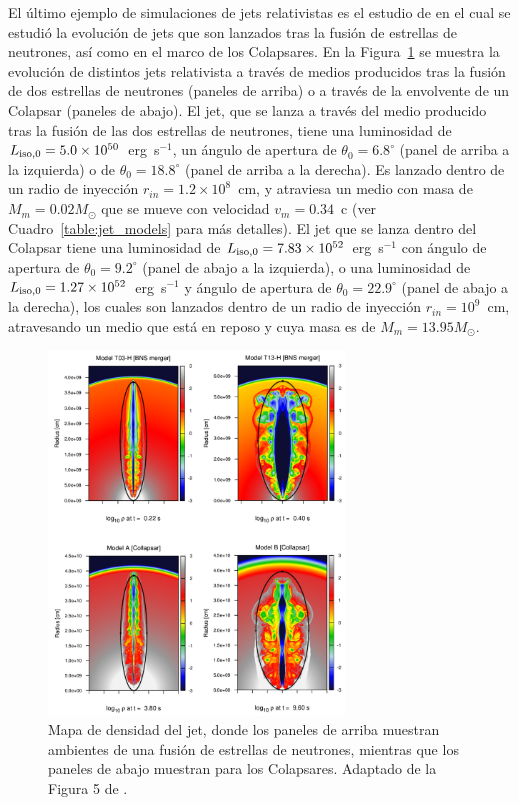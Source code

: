 \documentclass[12pt,a4paper]{book}
\begin{document}
El último ejemplo de simulaciones de jets relativistas es el estudio de \citet{JBEMGRB} en el cual se estudió la evolución de jets que son lanzados tras la fusión de estrellas de neutrones, así como en el  marco de los Colapsares. En la Figura~\ref{fig:jet_models} se muestra la evolución de distintos jets relativista a través de medios producidos tras la fusión de dos estrellas de neutrones (paneles de arriba) o 
a través de la envolvente de un Colapsar (paneles de abajo). El jet, que se lanza a través del medio producido tras la fusión de las dos estrellas de neutrones, tiene una luminosidad 
de $L_{\rm iso, 0} = 5.0 \times10^{50}$~erg~s$^{-1}$, un ángulo de apertura de $\theta_0=6.8^{\circ}$ (panel de arriba a la izquierda) o de $\theta_0=18.8^{\circ}$ (panel de arriba a la derecha). Es 
lanzado dentro de un radio de inyección $r_{in}=1.2\times10^{8}$~cm, y atraviesa un medio con masa de $M_{m} = 0.02 M_{\odot}$ que se mueve con velocidad $v_{m} = 0.34$~c (ver Cuadro~\ref{table:jet_models} para más detalles). 
El jet que se lanza dentro del Colapsar tiene una luminosidad de $L_{\rm iso, 0} = 7.83 \times10^{52}$~erg~s$^{-1}$ con ángulo de apertura de $\theta_0=9.2^{\circ}$ (panel de abajo a la izquierda), o una 
luminosidad de $L_{\rm iso, 0} = 1.27 \times10^{52}$~erg~s$^{-1}$ y ángulo de apertura de $\theta_0=22.9^{\circ}$ (panel de abajo a la derecha), los cuales son lanzados dentro de un radio de inyección $r_{in}=10^{9}$~cm, 
atravesando un medio que está en reposo y cuya masa es de $M_{m} = 13.95 M_{\odot}$.
\begin{figure} 
  \centering
    \includegraphics[width=0.7\textwidth]{Figuras/Introduccion/jet_models.png}
  \caption{Mapa de densidad del jet, donde los paneles de arriba muestran ambientes de una fusión de estrellas de neutrones, mientras que los paneles de abajo muestran para los Colapsares. Adaptado de la Figura 5 de
  \citet{JBEMGRB}.}
  \label{fig:jet_models}
\end{figure}
\end{document}
